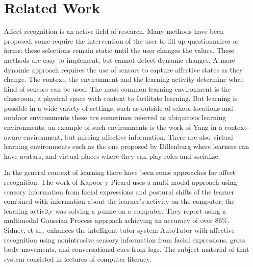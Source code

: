 \documentclass[conference]{IEEEtran}
\begin{document}
\section{Related Work}

Affect recognition is an active field of research. Many
methods have been proposed, some require the intervention of the user to fill up
questionnaires or forms; these selections remain static until the user changes
the values. These methods are easy to implement, but cannot detect dynamic
changes.  A more dynamic approach requires the use of sensors to capture
affective states as they change. The context, the environment and the learning
activity determine what kind of sensors can be used. The most common learning
environment is the classroom, a physical space with context to facilitate
learning. But learning is possible in a wide variety of settings, such as
outside-of-school locations and outdoor environments these are sometimes
referred as ubiquitous learning environments, an example of such environments is
the work of Yang \cite{yang2006context} in a context-aware environment, but missing affective
information. There are also virtual learning environments such as the one proposed by Dillenburg
\cite{dillenbourg2002virtual}  where learners can have avatars, and virtual places
where they can play roles and socialize.

In the general context of learning there have been some approaches for affect
recognition. The work of Kapoor y Picard \cite{kapoor2005multimodal} uses a multi modal
approach using sensory information from facial expressions and postural shifts
of the learner combined with information about the learner's activity on the
computer; the learning activity was solving a puzzle on a computer. They report
using a multimodal Gaussian Process approach achieving an accuracy of over 86\%.
Sidney, et al., \cite{sidney2005integrating} enhances the intelligent tutor system AutoTutor with
affective recognition using nonintrusive sensory information from facial
expressions, gross body movements, and conversational cues from logs.  The
subject material of that system consisted in lectures of computer literacy.
\end{document}

